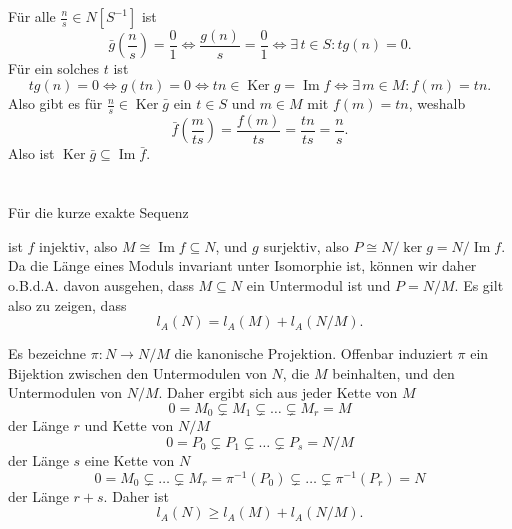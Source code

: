 \documentclass[a4paper,10pt]{article}
\theoremstyle{definition}
\newcommand{\Img}{\operatorname{Im}}
\newcommand{\Ker}{\operatorname{Ker}}
\begin{document}
Für alle $\frac{n}{s} \in N[S^{-1}]$ ist
\[
 \bar{g}\left(\frac{n}{s}\right) = \frac{0}{1}
 \Leftrightarrow \frac{g(n)}{s} = \frac{0}{1}
 \Leftrightarrow \exists\, t \in S : tg(n) = 0.
\]
Für ein solches $t$ ist
\[
 tg(n) = 0 
 \Leftrightarrow g(tn) = 0
 \Leftrightarrow tn \in \Ker g = \Img f
 \Leftrightarrow \exists\, m \in M : f(m) = tn.
\]
Also gibt es für $\frac{n}{s} \in \Ker \bar{g}$ ein $t \in S$ und $m \in M$ mit $f(m) = tn$, weshalb
\[
 \bar{f}\left( \frac{m}{ts} \right)
 = \frac{f(m)}{ts}
 = \frac{tn}{ts}
 = \frac{n}{s}.
\]
Also ist $\Ker \bar{g} \subseteq \Img \bar{f}$.


























      






\section{}
Für die kurze exakte Sequenz
\begin{center}
\end{center}
ist $f$ injektiv, also $M \cong \Img f \subseteq N$, und $g$ surjektiv, also $P \cong N / \ker g = N / \Img f$. Da die Länge eines Moduls invariant unter Isomorphie ist, können wir daher o.B.d.A. davon ausgehen, dass $M \subseteq N$ ein Untermodul ist und $P = N/M$. Es gilt also zu zeigen, dass
\[
 l_A(N) = l_A(M) + l_A(N/M).
\]

Es bezeichne $\pi : N \rightarrow N/M$ die kanonische Projektion. Offenbar induziert $\pi$ ein Bijektion zwischen den Untermodulen von $N$, die $M$ beinhalten, und den Untermodulen von $N/M$. Daher ergibt sich aus jeder Kette von $M$
\[
 0 = M_0 \subsetneq M_1 \subsetneq \ldots \subsetneq M_r = M
\]
der Länge $r$ und Kette von $N/M$
\[
 0 = P_0 \subsetneq P_1 \subsetneq \ldots \subsetneq P_s = N/M
\]
der Länge $s$ eine Kette von $N$
\[
 0 = M_0 \subsetneq \ldots \subsetneq M_r = \pi^{-1}(P_0) \subsetneq \ldots \subsetneq \pi^{-1}(P_r) = N
\]
der Länge $r+s$. Daher ist
\[
 l_A(N) \geq l_A(M) + l_A(N/M).
\]
\end{document}
